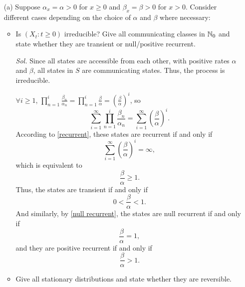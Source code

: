 \begin{enumerate}
    \item[(a)] Suppose $\alpha_x = \alpha > 0$ for $x \ge 0$ and $\beta_x = \beta > 0$ for $x > 0$. Consider different cases depending on the choice of $\alpha$ and $\beta$ where necessary:
    \begin{itemize}
        \item Is $(X_t: t \ge 0)$ irreducible? Give all communicating classes in $\mathbb{N}_0$ and state whether they are transient or null/positive recurrent.
        
        \textit{ Sol. } Since all states are accessible from each other, with positive rates $\alpha$ and $\beta$, all states in $S$ are communicating states. Thus, the process is irreducible.

        $\forall i \ge 1$, $\prod_{n=1}^i \frac{\beta_n}{\alpha_n} = \prod_{n=1}^i \frac{\beta}{\alpha} = \left( \frac{\beta}{\alpha} \right)^i$, so 
        \begin{equation*}
            \sum_{i=1}^\infty \prod_{n=1}^i \frac{\beta_n}{\alpha_n} = \sum_{i=1}^\infty \left( \frac{\beta}{\alpha} \right)^i.
        \end{equation*}
        According to \eqref{recurrent}, these states are recurrent if and only if 
        \begin{equation*}
            \sum_{i=1}^\infty \left( \frac{\beta}{\alpha} \right)^i = \infty,
        \end{equation*}
        which is equivalent to 
        \begin{equation*}
            \frac{\beta}{\alpha} \ge 1.
        \end{equation*}
        Thus, the states are transient if and only if 
        \begin{equation*}
            0 < \frac{\beta}{\alpha} < 1.
        \end{equation*}
        And similarly, by \eqref{null recurrent}, the states are null recurrent if and only if 
        \begin{equation*}
            \frac{\beta}{\alpha} = 1,
        \end{equation*}
        and they are positive recurrent if and only if 
        \begin{equation*}
            \frac{\beta}{\alpha} > 1.
        \end{equation*}
        \item Give all stationary distributions and state whether they are reversible.
        

\end{itemize}
\end{enumerate}
